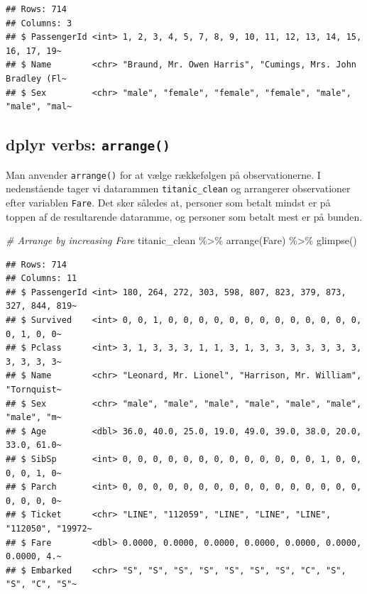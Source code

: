 \documentclass[
]{book}
\newenvironment{Shaded}{\begin{snugshade}}{\end{snugshade}}
\newcommand{\CommentTok}[1]{\textcolor[rgb]{0.56,0.35,0.01}{\textit{#1}}}
\newcommand{\FunctionTok}[1]{\textcolor[rgb]{0.00,0.00,0.00}{#1}}
\newcommand{\NormalTok}[1]{#1}
\newcommand{\SpecialCharTok}[1]{\textcolor[rgb]{0.00,0.00,0.00}{#1}}
\begin{document}
\begin{verbatim}
## Rows: 714
## Columns: 3
## $ PassengerId <int> 1, 2, 3, 4, 5, 7, 8, 9, 10, 11, 12, 13, 14, 15, 16, 17, 19~
## $ Name        <chr> "Braund, Mr. Owen Harris", "Cumings, Mrs. John Bradley (Fl~
## $ Sex         <chr> "male", "female", "female", "female", "male", "male", "mal~
\end{verbatim}

\hypertarget{dplyr-verbs-arrange}{%
\subsection{\texorpdfstring{dplyr verbs: \texttt{arrange()}}{dplyr verbs: arrange()}}\label{dplyr-verbs-arrange}}

Man anvender \texttt{arrange()} for at vælge rækkefølgen på observationerne. I nedenstående tager vi datarammen \texttt{titanic\_clean} og arrangerer observationer efter variablen \texttt{Fare}. Det sker således at, personer som betalt mindst er på toppen af de resultarende dataramme, og personer som betalt mest er på bunden.

\begin{Shaded}
\begin{Highlighting}[]
\CommentTok{\# Arrange by increasing Fare}
\NormalTok{titanic\_clean }\SpecialCharTok{\%\textgreater{}\%}
  \FunctionTok{arrange}\NormalTok{(Fare) }\SpecialCharTok{\%\textgreater{}\%}
  \FunctionTok{glimpse}\NormalTok{()}
\end{Highlighting}
\end{Shaded}

\begin{verbatim}
## Rows: 714
## Columns: 11
## $ PassengerId <int> 180, 264, 272, 303, 598, 807, 823, 379, 873, 327, 844, 819~
## $ Survived    <int> 0, 0, 1, 0, 0, 0, 0, 0, 0, 0, 0, 0, 0, 0, 0, 0, 0, 1, 0, 0~
## $ Pclass      <int> 3, 1, 3, 3, 3, 1, 1, 3, 1, 3, 3, 3, 3, 3, 3, 3, 3, 3, 3, 3~
## $ Name        <chr> "Leonard, Mr. Lionel", "Harrison, Mr. William", "Tornquist~
## $ Sex         <chr> "male", "male", "male", "male", "male", "male", "male", "m~
## $ Age         <dbl> 36.0, 40.0, 25.0, 19.0, 49.0, 39.0, 38.0, 20.0, 33.0, 61.0~
## $ SibSp       <int> 0, 0, 0, 0, 0, 0, 0, 0, 0, 0, 0, 0, 0, 1, 0, 0, 0, 0, 1, 0~
## $ Parch       <int> 0, 0, 0, 0, 0, 0, 0, 0, 0, 0, 0, 0, 0, 0, 0, 0, 0, 0, 0, 0~
## $ Ticket      <chr> "LINE", "112059", "LINE", "LINE", "LINE", "112050", "19972~
## $ Fare        <dbl> 0.0000, 0.0000, 0.0000, 0.0000, 0.0000, 0.0000, 0.0000, 4.~
## $ Embarked    <chr> "S", "S", "S", "S", "S", "S", "S", "C", "S", "S", "C", "S"~
\end{verbatim}
\end{document}
